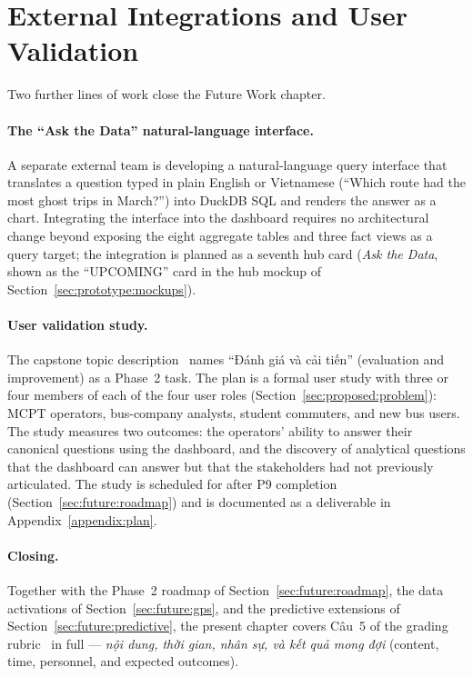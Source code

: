 \section{External Integrations and User Validation}
\label{sec:future:external}

Two further lines of work close the Future Work chapter.

\paragraph{The ``Ask the Data'' natural-language interface.}
A separate external team is developing a natural-language query
interface that translates a question typed in plain English or
Vietnamese (``Which route had the most ghost trips in March?'')
into DuckDB SQL and renders the answer as a chart. Integrating
the interface into the dashboard requires no architectural
change beyond exposing the eight aggregate tables and three
fact views as a query target; the integration is planned as a
seventh hub card (\emph{Ask the Data}, shown as the
``UPCOMING'' card in the hub mockup of
Section~\ref{sec:prototype:mockups}).

\paragraph{User validation study.}
The capstone topic description~\cite{capstoneDescription} names
``Đánh giá và cải tiến'' (evaluation and improvement) as a
Phase~2 task. The plan is a formal user study with three or
four members of each of the four user roles
(Section~\ref{sec:proposed:problem}): MCPT operators,
bus-company analysts, student commuters, and new bus users.
The study measures two outcomes: the operators' ability to
answer their canonical questions using the dashboard, and the
discovery of analytical questions that the dashboard can
answer but that the stakeholders had not previously
articulated. The study is scheduled for after P9 completion
(Section~\ref{sec:future:roadmap}) and is documented as a
deliverable in Appendix~\ref{appendix:plan}.

\paragraph{Closing.}
Together with the Phase~2 roadmap of
Section~\ref{sec:future:roadmap}, the data activations of
Section~\ref{sec:future:gps}, and the predictive extensions of
Section~\ref{sec:future:predictive}, the present chapter
covers Câu~5 of the grading rubric~\cite{rubric} in full ---
\emph{nội dung, thời gian, nhân sự, và kết quả mong đợi}
(content, time, personnel, and expected outcomes).

